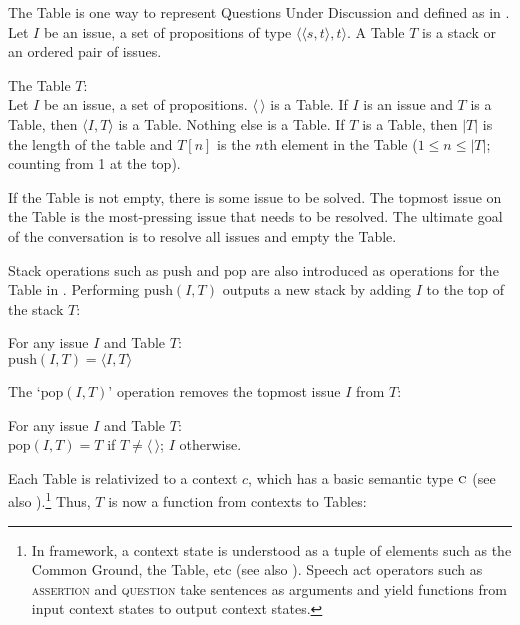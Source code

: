 \documentclass[output=paper,colorlinks,citecolor=brown]{langscibook}
\begin{document}
 The Table is one way to represent Questions Under Discussion \citep{Ro} and defined as in . Let $I$ be an issue, a set of propositions of type  $\langle\langle s, t\rangle, t\rangle$.  A Table $T$ is a stack or an ordered pair of issues.  






 \ea \label{defT} The Table $T$:\\
 Let $I$ be an issue, a set of propositions.
 \ea $\langle\, \rangle$ is a Table.
\ex If $I$ is an issue and $T$ is a Table, then $\langle I, T\rangle$ is a Table.
\ex Nothing else is a Table.
\ex If $T$ is a Table, then $|T|$ is the length of the table and $T[{n}]$ is the ${n}$th element in the Table ($1\leq n \leq |T|$; counting from 1 at the top).

\z
\z

If the Table is  not empty, there is some issue to be solved.  The topmost issue on the Table is the most-pressing issue that needs to be resolved.   The ultimate goal of the conversation is to resolve all issues and empty the Table.

  Stack operations such as $\mathrm{push}$ and $\mathrm{pop}$ are also introduced as  operations for the Table in \citet{FB}. Performing $\mathrm{push}(I, T)$ outputs a new stack  by adding  $I$ to
the top of the stack $T$:



\ea\label{oplus} For any issue $I$ and Table $T$: \\$\mathrm{push}(I, T) = \langle I, T\rangle$
\z

The `$\mathrm{pop}(I, T)$' operation  removes the topmost issue $I$ from $T$:

\ea\label{defpop} For any issue $I$ and Table $T$: \\$\mathrm{pop}(I, T) =  T$ if $T\neq \langle\,\rangle$; $I$ otherwise.
\z


Each Table is relativized to a context $c$, which has a basic semantic type $\textsc{c}$   (see also \citealt{Davis2}).\footnote{In  framework,  a context state is understood as  a tuple of elements such as the Common Ground, the Table, etc (see also \citealt{RF2015}).  Speech act operators such as \textsc{assertion} and \textsc{question} take sentences as
arguments and yield functions from  input context states to  output context states.}  Thus,  $T$ is now a function from contexts to Tables:
\end{document}
